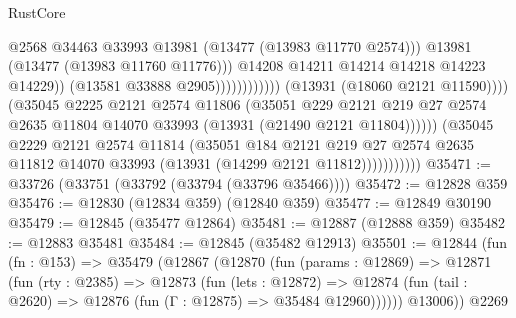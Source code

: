 \begin{lexlean}{RustCore}
\begin{coremodule}
                                                        @2568
                                                        @34463
                                                        @33993
                                                        @13981
                                                        (@13477 (@13983 @11770 @2574)))
                                                      @13981
                                                      (@13477 (@13983 @11760 @11776)))
                                                    @14208
                                                    @14211
                                                    @14214
                                                    @14218
                                                    @14223
                                                    @14229))
                                                (@13581 @33888 @2905))))))))))))
                          (@13931 (@18060 @2121 @11590))))
                      (@35045
                        @2225
                        @2121
                        @2574
                        @11806
                        (@35051
                          @229
                          @2121
                          @219
                          @27
                          @2574
                          @2635
                          @11804
                          @14070
                          @33993
                          (@13931 (@21490 @2121 @11804))))))
                  (@35045
                    @2229
                    @2121
                    @2574
                    @11814
                    (@35051
                      @184
                      @2121
                      @219
                      @27
                      @2574
                      @2635
                      @11812
                      @14070
                      @33993
                      (@13931 (@14299 @2121 @11812)))))))))))
@35471 := @33726 (@33751 (@33792 (@33794 (@33796 @35466))))
@35472 := @12828 @359
@35476 := @12830 (@12834 @359) (@12840 @359)
@35477 := @12849 @30190
@35479 := @12845 (@35477 @12864)
@35481 := @12887 (@12888 @359)
@35482 := @12883 @35481
@35484 := @12845 (@35482 @12913)
@35501 := @12844
    (fun (fn : @153) =>
    @35479
      (@12867
        (@12870
          (fun (params : @12869) =>
          @12871
            (fun (rty : @2385) =>
            @12873
              (fun (lets : @12872) =>
              @12874 (fun (tail : @2620) => @12876 (fun (Γ : @12875) => @35484 @12960))))))
        @13006))
    @2269

\end{coremodule}
\end{lexlean}
